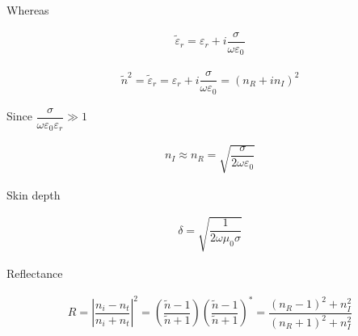 Whereas

\begin{equation*}
  \begin{aligned}
    \tilde{\varepsilon}_r = \varepsilon_r + i \dfrac{\sigma}{\omega \varepsilon_0} 
  \end{aligned}
\end{equation*}

\begin{equation*}
  \begin{aligned}
    \tilde{n}^2 = \tilde{\varepsilon}_r = \varepsilon_r + i \dfrac{\sigma}{\omega \varepsilon_0} = \left( n_R + i n_I \right)^2
  \end{aligned}
\end{equation*}

Since $\dfrac{\sigma}{\omega \varepsilon_0 \varepsilon_r} \gg 1 $

\begin{equation*}
  \begin{aligned}
    n_I \approx n_R = \sqrt{\dfrac{\sigma}{2 \omega \varepsilon_0} }
  \end{aligned}
\end{equation*}

Skin depth

\begin{equation*}
  \begin{aligned}
    \delta = \sqrt{\dfrac{1}{2 \omega \mu_0 \sigma} }
  \end{aligned}
\end{equation*}

Reflectance

\begin{equation*}
  \begin{aligned}
    R = \left| \dfrac{n_i - n_t}{n_i + n_t}  \right|^2 = \left( \dfrac{\tilde{n} - 1}{\tilde{n} + 1}  \right) \left( \dfrac{\tilde{n} - 1}{\tilde{n} + 1}  \right)^{*} = \dfrac{\left( n_R - 1 \right)^2 + n_I^2}{\left( n_R + 1 \right)^2 + n_I^2} 
  \end{aligned}
\end{equation*}




